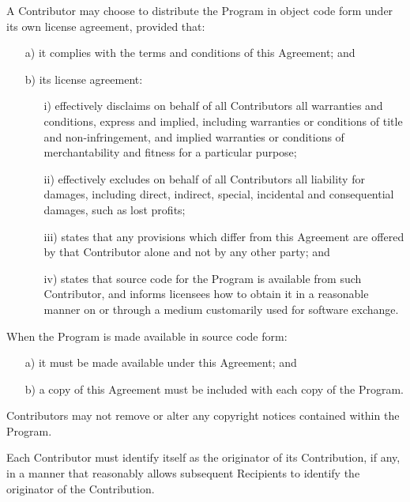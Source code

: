 A Contributor may choose to distribute the Program in object code form under its own license agreement, provided that:

\begin{itemize}

\item[a)] it complies with the terms and conditions of this Agreement; and


\item[b)]	its license agreement:


\begin{itemize}
\item[i)]	effectively disclaims
on behalf of all Contributors all warranties and conditions, express
and implied, including warranties or conditions of title and
non-infringement, and implied warranties or conditions of
merchantability and fitness for a particular purpose;


\item[ii)] effectively excludes on
behalf of all Contributors all liability for damages, including direct,
indirect, special, incidental and consequential damages, such as lost
profits;


\item[iii)]
states that any provisions which differ from this Agreement are offered
by that Contributor alone and not by any other party; and


\item[iv)] states that source code for the Program is
available from such Contributor, and informs licensees how to obtain it
in a reasonable manner on or through a medium customarily used for
software exchange.

\end{itemize}
\end{itemize}


When the Program is made available in source code form:

\begin{itemize}
\item[a)]	it must be made available under this Agreement; and

\item[b)]	a copy of this Agreement must be included with each copy of the Program.
\end{itemize}


Contributors may not remove or alter any copyright notices contained within the Program.  

Each Contributor must identify itself as the
originator of its Contribution, if any, in a manner that reasonably
allows subsequent Recipients to identify the originator of the
Contribution. 

